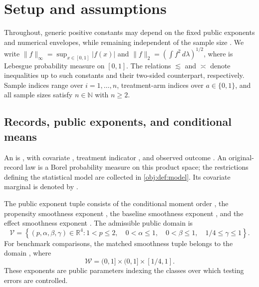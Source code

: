\section{Setup and assumptions}

Throughout, generic positive constants may depend on the fixed public exponents and numerical envelopes, while remaining independent of the sample size . We write \(\|f\|_\infty=\sup_{x\in[0,1]}|f(x)|\) and \(\|f\|_2=(\int f^2\,d\lambda)^{1/2}\), where  is Lebesgue probability measure on \([0,1]\). The relations \(\lesssim\) and \(\asymp\) denote inequalities up to such constants and their two-sided counterpart, respectively. Sample indices range over \(i=1,\ldots,n\), treatment-arm indices over \(a\in\{0,1\}\), and all sample sizes satisfy \(n\in\mathbb N\) with \(n\ge2\).

\subsection{Records, public exponents, and conditional means}

An  is , with covariate , treatment indicator , and observed outcome . An original-record law  is a Borel probability measure on this product space; the restrictions defining the statistical model are collected in \cref{obj:def:model}. Its covariate marginal is denoted by .

The public exponent tuple  consists of the conditional moment order , the propensity smoothness exponent , the baseline smoothness exponent , and the effect smoothness exponent . The admissible public domain  is
\[
\mathcal V
=
\left\{
(p,\alpha,\beta,\gamma)\in\mathbb R^4:
1<p\le2,\quad
0<\alpha\le1,\quad
0<\beta\le1,\quad
1/4\le\gamma\le1
\right\}.
\]
For benchmark comparisons, the matched smoothness tuple  belongs to the domain , where
\[
\mathcal W=(0,1]\times(0,1]\times[1/4,1].
\]
These exponents are public parameters indexing the classes over which testing errors are controlled.

